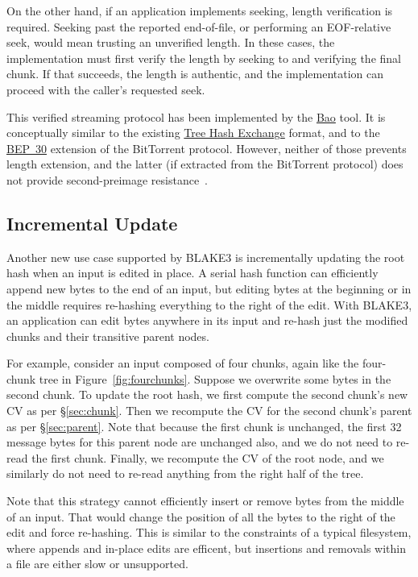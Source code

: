 \documentclass[11pt,notitlepage,a4paper]{article}
\begin{document}
On the other hand, if an application implements seeking, length verification is
required. Seeking past the reported end-of-file, or performing an EOF-relative
seek, would mean trusting an unverified length. In these cases, the
implementation must first verify the length by seeking to and verifying the
final chunk. If that succeeds, the length is authentic, and the implementation
can proceed with the caller's requested seek.

This verified streaming protocol has been implemented by the
\href{https://github.com/oconnor663/bao}{Bao} tool. It is conceptually similar
to the existing
\href{https://adc.sourceforge.io/draft-jchapweske-thex-02.html}{Tree Hash
Exchange} format, and to the
\href{https://www.bittorrent.org/beps/bep_0030.html}{BEP~30} extension of the
BitTorrent protocol. However, neither of those prevents length extension, and
the latter (if extracted from the BitTorrent protocol) does not provide
second-preimage resistance~\cite[\S8.5]{DBLP:journals/tosc/DaemenMA18}.

\subsection{Incremental Update}\label{sec:incrementalupdate}

Another new use case supported by BLAKE3 is incrementally updating the root
hash when an input is edited in place. A serial hash function can efficiently
append new bytes to the end of an input, but editing bytes at the beginning or
in the middle requires re-hashing everything to the right of the edit. With
BLAKE3, an application can edit bytes anywhere in its input and re-hash just
the modified chunks and their transitive parent nodes.

For example, consider an input composed of four chunks, again like the
four-chunk tree in Figure~\ref{fig:fourchunks}. Suppose we overwrite some bytes
in the second chunk. To update the root hash, we first compute the second
chunk's new CV as per \S\ref{sec:chunk}. Then we recompute the CV for the
second chunk's parent as per \S\ref{sec:parent}. Note that because the first
chunk is unchanged, the first 32 message bytes for this parent node are
unchanged also, and we do not need to re-read the first chunk. Finally, we
recompute the CV of the root node, and we similarly do not need to re-read
anything from the right half of the tree.

Note that this strategy cannot efficiently insert or remove bytes from the
middle of an input. That would change the position of all the bytes to the
right of the edit and force re-hashing. This is similar to the constraints of a
typical filesystem, where appends and in-place edits are efficent, but
insertions and removals within a file are either slow or unsupported.
\end{document}
